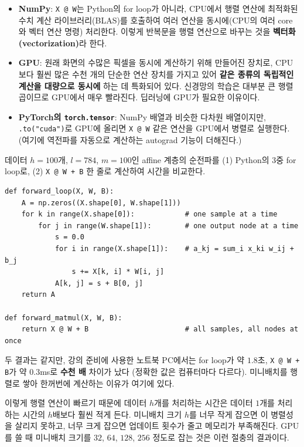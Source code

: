 \documentclass[11pt,a4paper]{article}
\begin{document}
\begin{itemize}[leftmargin=1.8em]
\item \textbf{NumPy}: \texttt{X @ W}는 Python의 for loop가 아니라,
CPU에서 행렬 연산에 최적화된 수치 계산 라이브러리(BLAS)를 호출하여
여러 연산을 동시에(CPU의 여러 core와 벡터 연산 명령) 처리한다.
이렇게 반복문을 행렬 연산으로 바꾸는 것을 \textbf{벡터화(vectorization)}라 한다.
\item \textbf{GPU}: 원래 화면의 수많은 픽셀을 동시에 계산하기 위해 만들어진 장치로,
CPU보다 훨씬 많은 수천 개의 단순한 연산 장치를 가지고 있어
\textbf{같은 종류의 독립적인 계산을 대량으로 동시에} 하는 데 특화되어 있다.
신경망의 학습은 대부분 큰 행렬곱이므로 GPU에서 매우 빨라진다.
딥러닝에 GPU가 필요한 이유이다.
\item \textbf{PyTorch의 \texttt{torch.tensor}}: NumPy 배열과 비슷한 다차원 배열이지만,
\texttt{.to("cuda")}로 GPU에 올리면 \texttt{X @ W} 같은 연산을 GPU에서 병렬로 실행한다.
(여기에 역전파를 자동으로 계산하는 autograd 기능이 더해진다.)
\end{itemize}

\begin{remarkbox}
데이터 $h=100$개, $l=784$, $m=100$인 affine 계층의 순전파를
(1) Python의 3중 for loop로, (2) \texttt{X @ W + B} 한 줄로 계산하여 시간을 비교한다.
\begin{lstlisting}
def forward_loop(X, W, B):
    A = np.zeros((X.shape[0], W.shape[1]))
    for k in range(X.shape[0]):            # one sample at a time
        for j in range(W.shape[1]):        # one output node at a time
            s = 0.0
            for i in range(X.shape[1]):    # a_kj = sum_i x_ki w_ij + b_j
                s += X[k, i] * W[i, j]
            A[k, j] = s + B[0, j]
    return A

def forward_matmul(X, W, B):
    return X @ W + B                       # all samples, all nodes at once
\end{lstlisting}
두 결과는 같지만, 강의 준비에 사용한 노트북 PC에서는
for loop가 약 $1.8$초, \texttt{X @ W + B}가 약 $0.3$ms로 \textbf{수천 배} 차이가 났다
(정확한 값은 컴퓨터마다 다르다).
미니배치를 행렬로 쌓아 한꺼번에 계산하는 이유가 여기에 있다.
\end{remarkbox}

이렇게 행렬 연산이 빠르기 때문에 데이터 $h$개를 처리하는 시간은
데이터 $1$개를 처리하는 시간의 $h$배보다 훨씬 적게 든다.
미니배치 크기 $h$를 너무 작게 잡으면 이 병렬성을 살리지 못하고,
너무 크게 잡으면 업데이트 횟수가 줄고 메모리가 부족해진다.
GPU를 쓸 때 미니배치 크기를 $32$, $64$, $128$, $256$ 정도로 잡는 것은 이런 절충의 결과이다.
\end{document}
